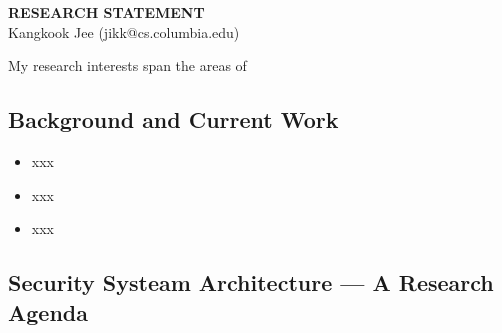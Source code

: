 \documentclass[letterpaper, 10pt]{article}
\begin{document}
\thispagestyle{fancy}

\lhead{}
\rhead{}

\renewcommand{\headrulewidth}{0pt} 
\renewcommand{\footrulewidth}{0pt} 
\fancyfoot[C]{\footnotesize \textcolor{gray}{http://www.cs.columbia.edu/$\sim$jikk/application}} 


\pagestyle{fancy}
\lhead{\textcolor{gray}{\it Kangkook Jee}}
\rhead{\textcolor{gray}{\thepage /\pageref{LastPage}}}

\begin{small}

\begin{center}
{\LARGE \bf RESEARCH STATEMENT}\\
\vspace*{0.1cm}
{\normalsize Kangkook Jee (jikk@cs.columbia.edu)}
\end{center}



My research interests span the areas of 

\subsection*{Background and Current Work}
\begin{itemize}
  \item xxx
  \item xxx
  \item xxx
\end{itemize}

\subsection*{Security Systeam Architecture ---  A Research Agenda}
\end{small}
\end{document}
